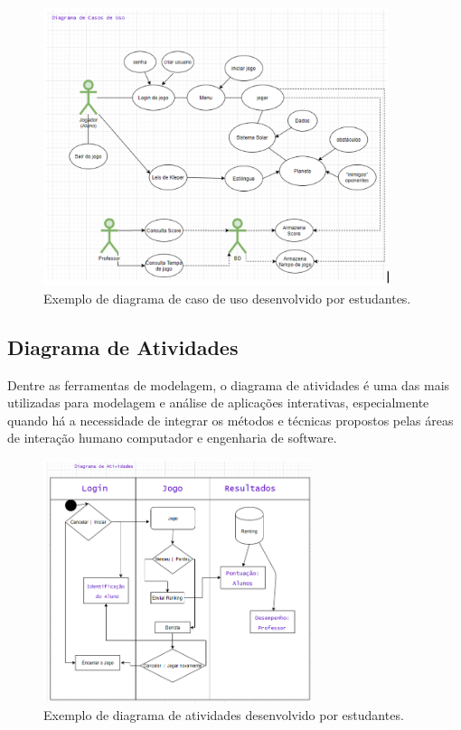 \documentclass[12pt, onecolumn]{IEEEtran}
\begin{document}
\begin{figure}[H]
    \centering
    \includegraphics[width=0.9\textwidth]{imagens/exemplo-diagrama-de-uso.png}
    \caption{Exemplo de diagrama de caso de uso desenvolvido por estudantes.}
    \label{fig:mesh1}
\end{figure}

\subsection{Diagrama de Atividades}

Dentre as ferramentas de modelagem, o diagrama de atividades é uma das mais utilizadas para modelagem e análise de aplicações interativas, especialmente quando há a necessidade  de integrar os métodos e técnicas propostos pelas áreas de interação humano computador e engenharia de software\cite{b27}.

\begin{figure}[H]
    \centering
    \includegraphics[width=0.7\textwidth]{imagens/exemplo-diagrama-de-atividades.png}
    \caption{Exemplo de diagrama de atividades desenvolvido por estudantes.}
    \label{fig:mesh1}
\end{figure}
\end{document}

